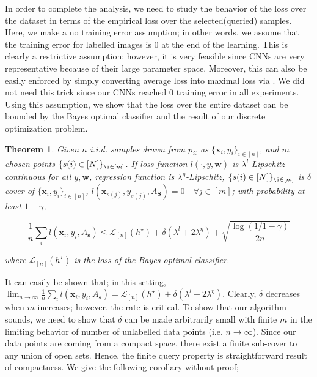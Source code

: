 \documentclass{article}
\newtheorem{theorem}{Theorem}
\begin{document}
In order to complete the analysis, we need to study the behavior of the loss over the dataset in terms of the empirical loss over the selected(queried) samples. Here, we make a no training error assumption; in other words, we assume that the training error for labelled images is $0$ at the end of the learning. This is clearly a restrictive assumption; however, it is very feasible since CNNs are very representative because of their large parameter space. Moreover, this can also be easily enforced by simply converting average loss into maximal loss via \cite{maximal_loss}. We did not need this trick since our CNNs reached 0 training error in all experiments. Using this assumption, we show that the loss over the entire dataset can be bounded by the Bayes optimal classifier and the result of our discrete optimization problem.

\begin{theorem}
Given $n$ i.i.d. samples drawn from $p_\mathcal{Z}$ as $\{\mathbf{x}_i,y_i\}_{i\in[n]}$, and $m$ chosen points $\{ s(i) \in [N]\}_{\i \in [m]}$. If loss function $l(\cdot,y,\mathbf{w})$ is $\lambda^l$-Lipschitz continuous for all $y, \mathbf{w}$, regression function is $\lambda^\eta$-Lipschitz, $\{ s(i) \in [N]\}_{\i \in [m]}$ is $\delta$ cover of $\{\mathbf{x}_i,y_i\}_{i\in[n]}$, $l(\mathbf{x}_{s(j)},y_{s(j)},A_\mathbf{S})=0\quad \forall j \in [m]$; with probability at least $1-\gamma$,
\begin{small}
\[
\frac{1}{n}\sum_i l(\mathbf{x}_i,y_i,A_\mathbf{s}) \leq \mathcal{L}_{[n]} (h^\star) +\delta(\lambda^l + 2 \lambda^{\eta}) + 
\sqrt{\frac{\log(1/1-\gamma)}{2n}}
\]
\end{small}
where $\mathcal{L}_{[n]} (h^\star)$ is the loss of the Bayes-optimal classifier.
\label{mainthm2}
\end{theorem}

It can easily be shown that; in this setting, $\lim_{n \rightarrow \infty} \frac{1}{n}\sum_i l(\mathbf{x}_i,y_i,A_\mathbf{s}) =   \mathcal{L}_{[n]} (h^\star) +\delta(\lambda^l + 2 \lambda^{\eta})$. Clearly, $\delta$ decreases when $m$ increases; however, the rate is critical. To show that our algorithm sounds, we need to show that $\delta$ can be made arbitrarily small with finite $m$ in the limiting behavior of number of unlabelled data points (i.e. $n \rightarrow \infty$). Since our data points are coming from a compact space, there exist a finite sub-cover to any union of open sets. Hence, the finite query property is straightforward result of compactness. We give the following corollary without proof;
\end{document}
